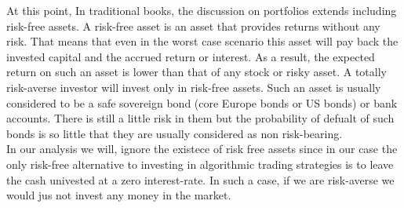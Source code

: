 At this point, In traditional books, the discussion on portfolios extends including risk-free assets. A risk-free asset is an asset that provides returns without any risk. That means that even in the worst case scenario this asset will pay back the invested capital and the accrued return or interest. As a result, the expected return on such an asset is lower than that of any stock or risky asset. A totally risk-averse investor will invest only in risk-free assets. Such an asset is usually considered to be a safe sovereign bond (core Europe bonds or US bonds) or bank accounts. There is still a little risk in them but the probability of defualt of such bonds is so little that they are usually considered as non risk-bearing. \\
In our analysis we will, ignore the existece of risk free assets since in our case the only risk-free alternative to investing in algorithmic trading strategies is to leave the cash univested at a zero interest-rate. In such a case, if we are risk-averse we would jus not invest any money in the market.